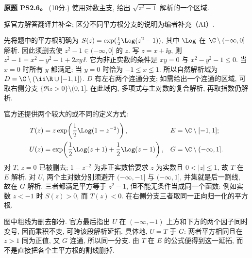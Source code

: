 \begin{exercise}\label{ass:ps2-6}
\textbf{原题 PS2.6。} (10分.) 使用对数主支, 给出 $\sqrt{z^2-1}$ 解析的一个区域.
\end{exercise}
\begin{solution}
据官方解答翻译并补全; 区分不同平方根分支的说明为编者补充（AI）.

先将题中的平方根明确为
$S(z)=\exp(\tfrac12\Log(z^2-1))$, 其中 $\Log$ 在 $\C\setminus(-\infty,0]$ 解析.
因此须删去使 $z^2-1\in(-\infty,0]$ 的 $z$.
写 $z=x+\ii y$, 则 $z^2-1=x^2-y^2-1+2xy\,\ii$.
它为非正实数的条件是 $xy=0$ 与 $x^2-y^2-1\le0$.
当 $x=0$ 时所有 $y$ 都满足; 当 $y=0$ 时恰为 $-1\le x\le1$.
所以自然解析域为
$D=\C\setminus(\ii\R\cup[-1,1])$.
$D$ 有左右两个连通分支; 如需给出一个连通的区域, 可取右侧分支
$\{\Re z>0\}\setminus(0,1]$. 在此域内, 多项式与主对数的复合解析, 再取指数仍解析.

官方还提供两个较大的或不同的定义方式:
\[
 \begin{aligned}
 T(z)&=z\exp\!\left(\frac12\Log(1-z^{-2})\right),
 & E&=\C\setminus[-1,1];\\
 U(z)&=\exp\!\left(\frac12\Log(z+1)+\frac12\Log(z-1)\right),
 & G&=\C\setminus(-\infty,1].
 \end{aligned}
\]
对 $T$, $z=0$ 已被删去; $1-z^{-2}$ 为非正实数恰要求 $z$ 为实数且 $0<|z|\le1$, 故 $T$ 在 $E$ 解析.
对 $U$, 两个主对数分别须避开 $(-\infty,-1]$ 与 $(-\infty,1]$, 并集就是后一割线, 故在 $G$ 解析.
三者都满足平方等于 $z^2-1$, 但不能无条件当成同一个函数:
例如实数 $z<-1$ 时 $S(z)>0$, 而 $T(z)<0$.
在右侧分支三者取同一正向归一化的平方根.
\begin{center}
\end{center}
图中粗线为删去部分. 官方最后指出 $U$ 在 $(-\infty,-1)$ 上方和下方的两个因子同时变号, 因而乘积不变, 可跨该段解析延拓. 具体地, $U=T$ 于 $G$: 两者平方相同且在 $z>1$ 同为正值, 又 $G$ 连通, 所以同一分支. 由 $T$ 在 $E$ 的公式便得到这一延拓, 而不是直接把各个主平方根的割线删掉.
\end{solution}
